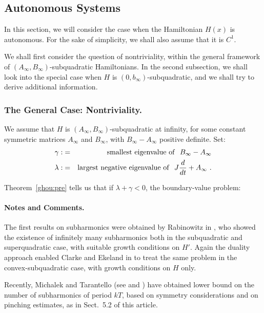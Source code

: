 \documentclass{llncs}
\begin{document}
%
\subsection{Autonomous Systems}
%





In this section, we will consider the case when the Hamiltonian $H(x)$
is autonomous. For the sake of simplicity, we shall also assume that it
is $C^{1}$.

We shall first consider the question of nontriviality, within the
general framework of
$\left(A_{\infty},B_{\infty}\right)$-subquadratic Hamiltonians. In
the second subsection, we shall look into the special case when $H$ is
$\left(0,b_{\infty}\right)$-subquadratic,
and we shall try to derive additional information.
%
\subsubsection{The General Case: Nontriviality.}
%
We assume that $H$ is
$\left(A_{\infty},B_{\infty}\right)$-sub\-qua\-dra\-tic at infinity,
for some constant symmetric matrices $A_{\infty}$ and $B_{\infty}$,
with $B_{\infty}-A_{\infty}$ positive definite. Set:
\begin{eqnarray}
\gamma :&=&{\rm smallest\ eigenvalue\ of}\ \ B_{\infty} - A_{\infty} \\
  \lambda : &=& {\rm largest\ negative\ eigenvalue\ of}\ \
  J \frac{d}{dt} +A_{\infty}\ .
\end{eqnarray}

Theorem~\ref{ghou:pre} tells us that if $\lambda +\gamma < 0$, the
boundary-value problem:


\paragraph{Notes and Comments.}


The first results on subharmonics were
obtained by Rabinowitz in \cite{rab}, who showed the existence of
infinitely many subharmonics both in the subquadratic and superquadratic
case, with suitable growth conditions on $H'$. Again the duality
approach enabled Clarke and Ekeland in \cite{clar:eke:2} to treat the
same problem in the convex-subquadratic case, with growth conditions on
$H$ only.

Recently, Michalek and Tarantello (see \cite{mich:tar} and \cite{tar})
have obtained lower bound on the number of subharmonics of period $kT$,
based on symmetry considerations and on pinching estimates, as in
Sect.~5.2 of this article.
\end{document}
